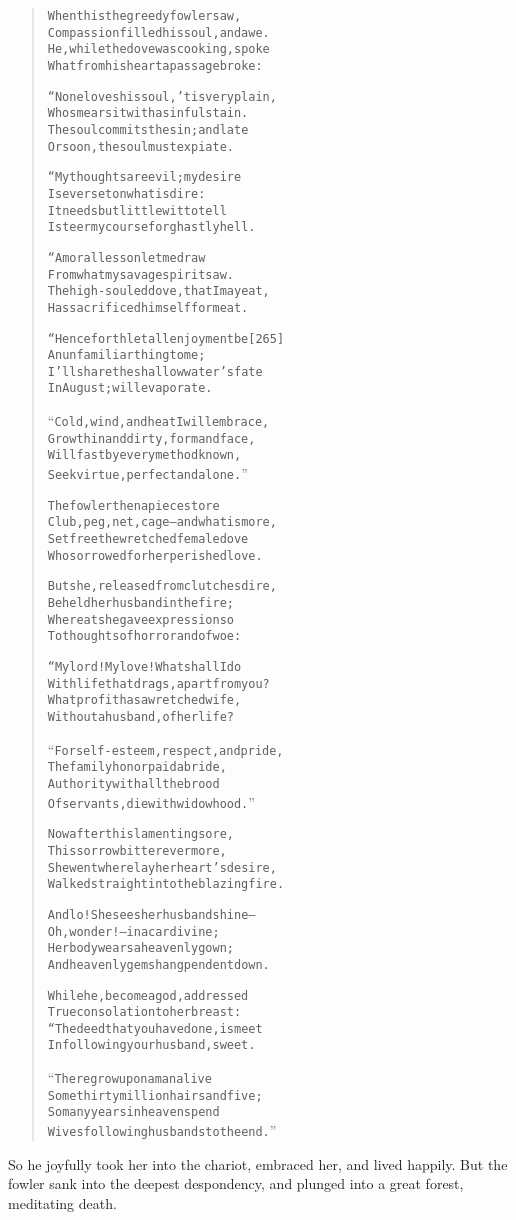\documentclass[article, twoside, 14pt]{memoir}
\renewenvironment{verbatim}{%
\begin{quote}%
\vskip -10pt%
\begin{alltt}\normalfont\large}{\end{alltt}%
\end{quote}%
\vskip -10pt
} %
\begin{document}
\begin{verbatim}
When this the greedy fowler saw,
Compassion filled his soul, and awe.
He, while the dove was cooking, spoke
What from his heart a passage broke:

“None loves his soul, 'tis very plain,
Who smears it with a sinful stain.
The soul commits the sin; and late
Or soon, the soul must expiate.

“My thoughts are evil; my desire
Is ever set on what is dire:
It needs but little wit to tell
I steer my course for ghastly hell.

“A moral lesson let me draw
From what my savage spirit saw.
The high-souled dove, that I may eat,
Has sacrificed himself for meat.

“Henceforth let all enjoyment be                        [265]
An unfamiliar thing to me;
I'll share the shallow water's fate
In August; will evaporate.

“Cold, wind, and heat I will embrace,
Grow thin and dirty, form and face,
Will fast by every method known,
Seek virtue, perfect and alone.”

The fowler then apieces tore
Club, peg, net, cage--and what is more,
Set free the wretched female dove
Who sorrowed for her perished love.

But she, released from clutches dire,
Beheld her husband in the fire;
Whereat she gave expression so
To thoughts of horror and of woe:

“My lord! My love! What shall I do
With life that drags, apart from you?
What profit has a wretched wife,
Without a husband, of her life?

“For self-esteem, respect, and pride,
The family honor paid a bride,
Authority with all the brood
Of servants, die with widowhood.”

Now after this lamenting sore,
This sorrow bitter evermore,
She went where lay her heart's desire,
Walked straight into the blazing fire.

And lo! She sees her husband shine--
Oh, wonder!--in a car divine;
Her body wears a heavenly gown;
And heavenly gems hang pendent down.

While he, become a god, addressed
True consolation to her breast:
“The deed that you have done, is meet
In following your husband, sweet.

“There grow upon a man alive
Some thirty million hairs and five;
So many years in heaven spend
Wives following husbands to the end.”
\end{verbatim}
So he joyfully took her into the chariot, embraced her, and lived
happily. But the fowler sank into the deepest despondency, and
plunged into a great forest, meditating death.
\end{document}
